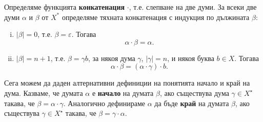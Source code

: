 Определяме функцията {\bf конкатенация} $\cdot$, т.е.
слепване на две думи.
За всеки две думи $\alpha$ и $\beta$ от $X^*$ определяме тяхната конкатенация с индукция по дължината $\beta$:
\begin{enumerate}[(i)]
  \item
    $|\beta| = 0$, т.е. $\beta = \varepsilon$.
    Тогава \[\alpha\cdot\beta = \alpha.\]
  \item
    $|\beta| = n+1$, т.е. $\beta = \gamma b$, за някоя дума $\gamma$, $|\gamma| = n$, и някоя буква $b\in X$.
    Тогава \[\alpha\cdot\beta = (\alpha\cdot\gamma)\cdot b.\]
\end{enumerate}

Сега можем да даден алтернативни дефиниции на понятията начало и край на дума.
Казваме, че думата $\alpha$ е {\bf начало} на думата $\beta$, ако съществува дума $\gamma \in X^\star$ такава, че
$\beta = \alpha\cdot\gamma$.
Аналогично дефинираме $\alpha$ да бъде {\bf край} на думата $\beta$, ако съществува $\gamma \in X^\star$ такава, че
$\beta = \gamma \cdot \alpha$.

